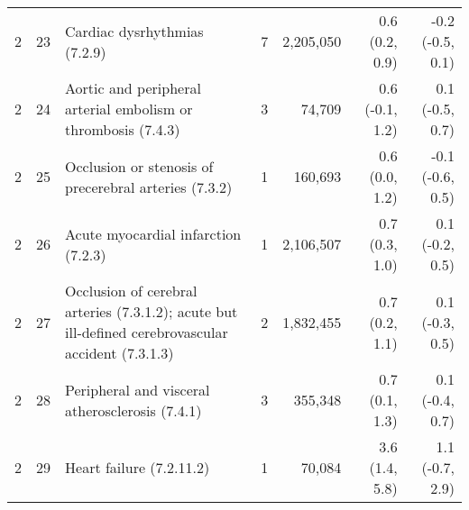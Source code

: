 \begin{tabular}{llp{6.5cm}rrrr}
   2 & 23 & Cardiac dysrhythmias (7.2.9) &  7 & 2,205,050 & 0.6 (0.2, 0.9) & -0.2 (-0.5, 0.1) \\ 
   2 & 24 & Aortic and peripheral arterial embolism or thrombosis (7.4.3) &  3 & 74,709 & 0.6 (-0.1, 1.2) & 0.1 (-0.5, 0.7) \\ 
   2 & 25 & Occlusion or stenosis of precerebral arteries (7.3.2) &  1 & 160,693 & 0.6 (0.0, 1.2) & -0.1 (-0.6, 0.5) \\ 
   2 & 26 & Acute myocardial infarction (7.2.3) &  1 & 2,106,507 & 0.7 (0.3, 1.0) & 0.1 (-0.2, 0.5) \\ 
   2 & 27 & Occlusion of cerebral arteries (7.3.1.2); acute but ill-defined cerebrovascular accident (7.3.1.3) &  2 & 1,832,455 & 0.7 (0.2, 1.1) & 0.1 (-0.3, 0.5) \\ 
   2 & 28 & Peripheral and visceral atherosclerosis (7.4.1) &  3 & 355,348 & 0.7 (0.1, 1.3) & 0.1 (-0.4, 0.7) \\ 
   2 & 29 & Heart failure (7.2.11.2) &  1 & 70,084 & 3.6 (1.4, 5.8) & 1.1 (-0.7, 2.9) \\ 
   \hline
\end{tabular}

